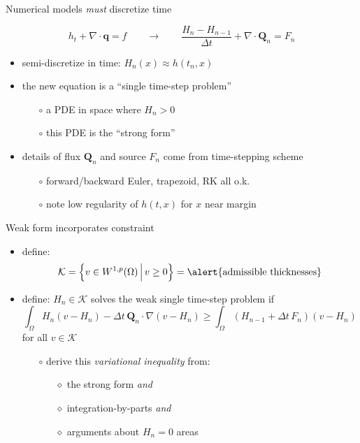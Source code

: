 \documentclass{beamer}
\newcommand\bq{\mathbf{q}}
\newcommand\bQ{\mathbf{Q}}
\newcommand{\Div}{\nabla\cdot}
\newcommand{\grad}{\nabla}
\begin{document}
\begin{frame}{Numerical models \emph{must} discretize time}

$$h_t + \Div\bq = f \qquad \to \qquad \frac{H_n - H_{n-1}}{\Delta t} + \Div \bQ_n = F_n$$

  \begin{itemize}
  \item semi-discretize in time: $H_n(x) \approx h(t_n,x)$
  \item the new equation is a ``single time-step problem''
    \begin{itemize}
    \item[$\circ$] a PDE in space \alert{where $H_n>0$}
    \item[$\circ$] this PDE is the ``strong form''
    \end{itemize}
  \item details of flux $\bQ_n$ and source $F_n$ come from time-stepping scheme
    \begin{itemize}
    \item[$\circ$] forward/backward Euler, trapezoid, RK all o.k.
    \item[$\circ$] note low regularity of $h(t,x)$ for $x$ near margin
    \end{itemize}
  \end{itemize}
\end{frame}


\begin{frame}{Weak form incorporates constraint}

  \begin{itemize}
  \item define:
    $$\mathcal{K} = \left\{v \in W^{1,p}(\Omega) \,\Big|\, v\ge 0\right\} = \text{\alert{admissible thicknesses}}$$
  \item define: $H_n \in \mathcal{K}$ solves the \alert{weak single time-step problem} if
    $$\int_\Omega H_n (v - H_n) - \Delta t\, \bQ_n \cdot \grad(v - H_n) \ge \int_\Omega \left(H_{n-1} + \Delta t\, F_n\right) (v - H_n)$$
  for all $v \in \mathcal{K}$
  \small
  \medskip
    \begin{itemize}
    \item[$\circ$] derive this \emph{variational inequality} from:
      \begin{itemize}
      \item[$\diamond$] the strong form \emph{and}
      \item[$\diamond$] integration-by-parts \emph{and}
      \item[$\diamond$] arguments about $H_n=0$ areas
      \end{itemize}
    \end{itemize}
  \end{itemize}
\end{frame}
\end{document}
